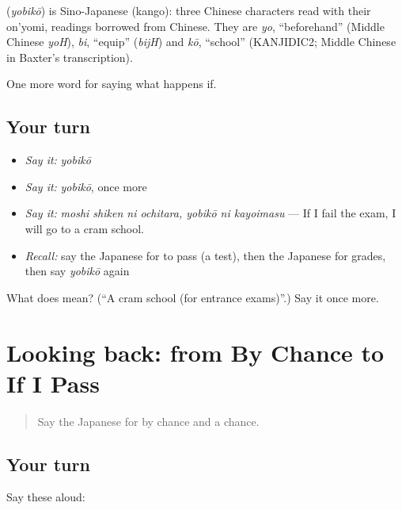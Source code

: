\begin{cousinweb}
\textbf{} (\emph{yobikō}) is Sino-Japanese (kango): three Chinese characters read with their on'yomi, readings borrowed from Chinese. They are \emph{yo}, \textquotedblleft{}beforehand\textquotedblright{} (Middle Chinese \emph{yoH}), \emph{bi}, \textquotedblleft{}equip\textquotedblright{} (\emph{bijH}) and \emph{kō}, \textquotedblleft{}school\textquotedblright{} (KANJIDIC2; Middle Chinese in Baxter's transcription).
\end{cousinweb}

\begin{grammarlens}[title={What you've built}]
One more word for saying what happens if.
\end{grammarlens}

\subsection*{Your turn}
\begin{itemize}
\raggedright
  \item \emph{Say it:} \emph{yobikō}
  \item \emph{Say it:} \emph{yobikō}, once more
  \item \emph{Say it:} \emph{moshi shiken ni ochitara, yobikō ni kayoimasu} — If I fail the exam, I will go to a cram school.
  \item \emph{Recall:} say the Japanese for to pass (a test), then the Japanese for grades, then say \emph{yobikō} again
\end{itemize}

\begin{tcolorbox}[breakable,colback=teal!4,colframe=teal!35!black,title={Before you move on}]
What does  mean? (\textquotedblleft{}A cram school (for entrance exams)\textquotedblright{}.) Say it once more.
\end{tcolorbox}
\section[(dialogue)]{Looking back: from By Chance to If I Pass}

\label{lesson:JA-R515-review-510-515}



\begin{quote}
Say the Japanese for by chance and a chance.
\end{quote}

\subsection*{Your turn}
Say these aloud:

